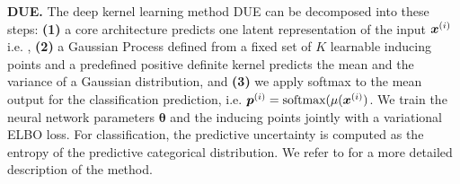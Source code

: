 


\textbf{DUE.} The deep kernel learning method DUE \citep{due} can be decomposed into these steps: \textbf{(1)} a core architecture predicts one latent representation of the input $\bm{x}^{(i)}$ i.e. , 
\textbf{(2)} a Gaussian Process defined from a fixed set of $K$ learnable inducing points  and a predefined positive definite kernel \smash{$\kappa(\cdot, \cdot)$} predicts the mean  and the variance  of a Gaussian distribution, and 
\textbf{(3)} we apply softmax to the mean output  for the classification prediction, i.e. $\bm{p}^{(i)} = \text{softmax}(\mu(\bm{x}^{(i)})$. We train the neural network parameters $\bm{\theta}$ and the inducing points  jointly with a variational ELBO loss.
For classification, the predictive uncertainty is computed as the entropy of the predictive categorical distribution. 
We refer to \citep{due} for a more detailed description of the method.

